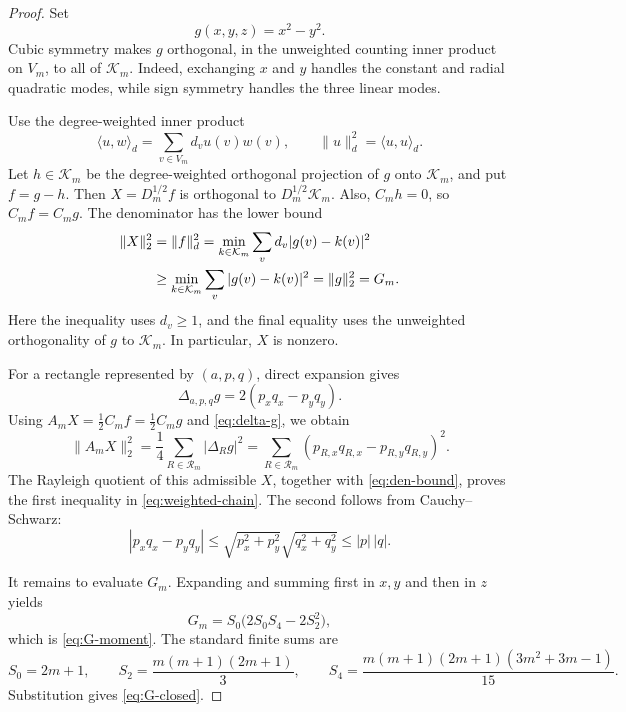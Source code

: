\documentclass[11pt]{article}
\theoremstyle{definition}
\theoremstyle{remark}
\newcommand{\ip}[2]{\langle #1,#2\rangle}
\newcommand{\norm}[1]{\lVert #1\rVert}
\begin{document}
\begin{proof}
Set
\[
 g(x,y,z)=x^2-y^2.
\]
Cubic symmetry makes $g$ orthogonal, in the unweighted counting inner
product on $V_m$, to all of $\mathcal K_m$.  Indeed, exchanging $x$ and $y$
handles the constant and radial quadratic modes, while sign symmetry handles
the three linear modes.

Use the degree-weighted inner product
\[
 \ip{u}{w}_d=\sum_{v\in V_m}d_vu(v)w(v),
 \qquad \norm{u}_d^2=\ip{u}{u}_d.
\]
Let $h\in\mathcal K_m$ be the degree-weighted orthogonal projection of $g$
onto $\mathcal K_m$, and put $f=g-h$.  Then
$X=D_m^{1/2}f$ is orthogonal to $D_m^{1/2}\mathcal K_m$.  Also,
$C_mh=0$, so $C_mf=C_mg$.  The denominator has the lower bound
\begin{align}
 \norm{X}_2^2
 &=\norm{f}_d^2
 =\min_{k\in\mathcal K_m}\sum_v d_v|g(v)-k(v)|^2\notag\\
 &\geq\min_{k\in\mathcal K_m}\sum_v|g(v)-k(v)|^2
 =\norm{g}_2^2=G_m.\label{eq:den-bound}
\end{align}
Here the inequality uses $d_v\geq1$, and the final equality uses the
unweighted orthogonality of $g$ to $\mathcal K_m$.  In particular, $X$ is
nonzero.

For a rectangle represented by $(a,p,q)$, direct expansion gives
\begin{equation}\label{eq:delta-g}
 \Delta_{a,p,q}g=2(p_xq_x-p_yq_y).
\end{equation}
Using $A_mX=\tfrac12C_mf=\tfrac12C_mg$ and \eqref{eq:delta-g}, we obtain
\begin{equation}\label{eq:num-bound}
 \norm{A_mX}_2^2
 =\frac14\sum_{R\in\mathcal R_m}|\Delta_Rg|^2
 =\sum_{R\in\mathcal R_m}(p_{R,x}q_{R,x}-p_{R,y}q_{R,y})^2.
\end{equation}
The Rayleigh quotient of this admissible $X$, together with
\eqref{eq:den-bound}, proves the first inequality in
\eqref{eq:weighted-chain}.  The second follows from Cauchy--Schwarz:
\[
 |p_xq_x-p_yq_y|
 \leq\sqrt{p_x^2+p_y^2}\sqrt{q_x^2+q_y^2}
 \leq |p|\,|q|.
\]

It remains to evaluate $G_m$.  Expanding and summing first in $x,y$ and then
in $z$ yields
\[
 G_m=S_0\bigl(2S_0S_4-2S_2^2\bigr),
\]
which is \eqref{eq:G-moment}.  The standard finite sums are
\[
 S_0=2m+1,\qquad
 S_2=\frac{m(m+1)(2m+1)}{3},\qquad
 S_4=\frac{m(m+1)(2m+1)(3m^2+3m-1)}{15}.
\]
Substitution gives \eqref{eq:G-closed}.
\end{proof}
\end{document}
